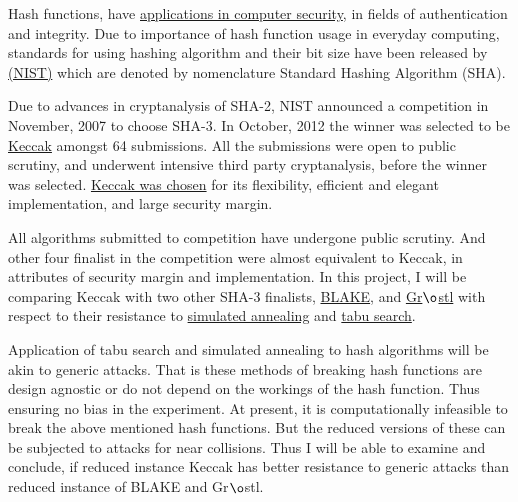 \begin{abstractpage}

  Hash functions, have \href{"http://en.wikipedia.org/wiki/Cryptographic\_hash\_function\#Applications"}
  {applications in computer security}, in fields of authentication and integrity.
  Due to importance of hash function usage in everyday computing, standards for using hashing 
  algorithm and their bit size have been released by \href{"http://www.nist.gov/index.html"}
  {(NIST)} which are denoted by nomenclature Standard Hashing Algorithm (SHA).

  Due to advances in cryptanalysis of SHA-2, NIST announced a competition in November, 2007 
  to choose SHA-3. In October, 2012 the winner was selected to be \href{"http://keccak.noekeon.org/"}
  {Keccak} amongst 64 submissions. All the submissions were open to public scrutiny, and underwent
  intensive third party cryptanalysis, before the winner was selected. 
  \href{"http://csrc.nist.gov/groups/ST/hash/sha-3/sha-3\_selection\_announcement.pdf"}{Keccak was chosen}
   for its flexibility, efficient and elegant implementation, and large security margin.

  All algorithms submitted to competition have undergone public scrutiny. And other four finalist in 
  the competition were almost equivalent to Keccak, in attributes of security margin and implementation.
  In this project, I will be comparing Keccak with two other SHA-3 finalists, \href{"https://131002.net/blake/"}
  {BLAKE}, and \href{"http://www.groestl.info/"}{Gr$\o$stl} with respect to their resistance to 
  \href{"http://en.wikipedia.org/wiki/Simulated\_annealing"}{simulated annealing} and 
  \href{"http://en.wikipedia.org/wiki/Tabu\_search"}{tabu search}.
  
  Application of tabu search and simulated annealing to hash algorithms will be akin to generic attacks.
  That is these methods of breaking hash functions are design agnostic or do not depend on the workings
  of the hash function. Thus ensuring no bias in the experiment. At present, it is computationally infeasible
  to break the above mentioned hash functions. But the reduced versions of these can be subjected to attacks
  for near collisions. Thus I will be able to examine and conclude, if reduced instance Keccak has better 
  resistance to generic attacks than reduced instance of BLAKE and Gr$\o$stl.
  
\end{abstractpage}
